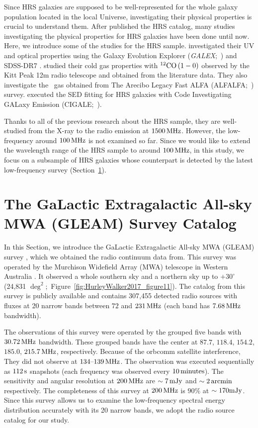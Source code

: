 Since HRS galaxies are supposed to be well-represented for the whole galaxy population located in the local Universe, investigating their physical properties is crucial to understand them.
After \citet{Boselli2010} published the HRS catalog, many studies investigating the physical properties for HRS galaxies have been done until now.
Here, we introduce some of the studies for the HRS sample.
\citet{Cortese2012} investigated their UV and optical properties using the Galaxy Evolution Explorer ({\it GALEX\/};~\citealt{Martin2005}) and SDSS-DR7 \citep{Abazajian2009}.
\citet{Boselli2014} studied their cold gas properties with $^{12}\mathrm{CO}\left(1-0\right)$ observed by the Kitt Peak 12m radio telescope and obtained from the literature data.
They also investigate the \nh~gas obtained from The Arecibo Legacy Fast ALFA (ALFALFA;~\citealt{Giovanelli2005, Haynes2011}) survey.
\citet{Ciesla2014} executed the SED fitting for HRS galaxies with Code Investigating GALaxy Emission (CIGALE;~\citealt{Noll2009}).

Thanks to all of the previous research about the HRS sample, they are well-studied from the X-ray to the radio emission at $1500\,\mathrm{MHz}$.
However, the low-frequency around $100\,\mathrm{MHz}$ is not examined so far.
Since we would like to extend the wavelength range of the HRS sample to around $100\,\mathrm{MHz}$, in this study, we focus on a subsample of HRS galaxies whose counterpart is detected by the latest low-frequency survey (Section~\ref{sec:gleamsurvey}).



\section{The GaLactic Extragalactic All-sky MWA (GLEAM) Survey Catalog}\label{sec:gleamsurvey}

In this Section, we introduce the GaLactic Extragalactic All-sky MWA (GLEAM) survey \citep{Hurley-Walker2017a}, which we obtained the radio continuum data from.
This survey was operated by the Murchison Widefield Array (MWA) telescope in Western Australia \citep{Tingay2013a}.
It observed a whole southern sky and a northern sky up to $+30^{\circ}$ (24,831 $\mathrm{\deg}^2$;~Figure~\ref{fig:HurleyWalker2017_figure11}).
The catalog from this survey is publicly available and contains 307,455 detected radio sources with fluxes at 20 narrow bands between $72$ and $231\,\mathrm{MHz}$ (each band has $7.68\,\mathrm{MHz}$ bandwidth).

The observations of this survey were operated by the grouped five bands with $30.72\,\mathrm{MHz}$ bandwidth.
These grouped bands have the center at $87.7$, $118.4$, $154.2$, $185.0$, $215.7\,\mathrm{MHz}$, respectively.
Because of the orbcomm satellite interference, They did not observe at $134\mbox{--}139\,\mathrm{MHz}$.
The observation was executed sequentially as $112\,\mathrm{s}$ snapshots (each frequency was observed every $10\,\mathrm{minutes}$).
The sensitivity and angular resolution at $200\,\mathrm{MHz}$ are $\sim 7\,\mathrm{mJy}$ and $\sim 2\,\mathrm{arcmin}$ respectively.
The completeness of this survey at $200\,\mathrm{MHz}$ is $90\%$ at $\sim 170\mathrm{mJy}$.
Since this survey allows us to examine the low-frequency spectral energy distribution accurately with its 20 narrow bands, we adopt the radio source catalog for our study.

